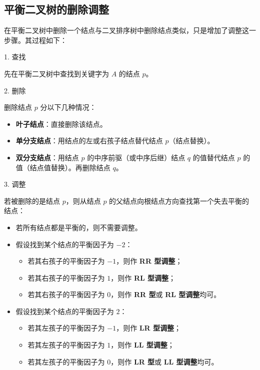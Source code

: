 \documentclass[lang=cn,newtx,10pt,scheme=chinese]{../elegantbook}
\begin{document}
\subsection{平衡二叉树的删除调整}

在平衡二叉树中删除一个结点与二叉排序树中删除结点类似，只是增加了调整这一步骤。其过程如下：

1. 查找  

   先在平衡二叉树中查找到关键字为 $A$ 的结点 $p$。

2. 删除  

   删除结点 $p$ 分以下几种情况：
   \begin{itemize}
     \item \textbf{叶子结点}：直接删除该结点。
     \item \textbf{单分支结点}：用结点的左或右孩子结点替代结点 $p$（结点替换）。
     \item \textbf{双分支结点}：用结点 $p$ 的中序前驱（或中序后继）结点 $q$ 的值替代结点 $p$ 的值（结点值替换）。再删除结点 $q$。
   \end{itemize}

3. 调整  

   若被删除的是结点 $p$，则从结点 $p$ 的父结点向根结点方向查找第一个失去平衡的结点：
   \begin{itemize}
     \item 若所有结点都是平衡的，则不需要调整。
     \item 假设找到某个结点的平衡因子为 $-2$：
       \begin{itemize}
         \item 若其右孩子的平衡因子为 $-1$，则作 \textbf{RR 型调整}；
         \item 若其右孩子的平衡因子为 $1$，则作 \textbf{RL 型调整}；
         \item 若其右孩子的平衡因子为 $0$，则作 \textbf{RR 型}或 \textbf{RL 型调整}均可。
       \end{itemize}
     \item 假设找到某个结点的平衡因子为 $2$：
       \begin{itemize}
         \item 若其左孩子的平衡因子为 $-1$，则作 \textbf{LR 型调整}；
         \item 若其左孩子的平衡因子为 $1$，则作 \textbf{LL 型调整}；
         \item 若其左孩子的平衡因子为 $0$，则作 \textbf{LR 型}或 \textbf{LL 型调整}均可。
       \end{itemize}
   \end{itemize}
\end{document}
